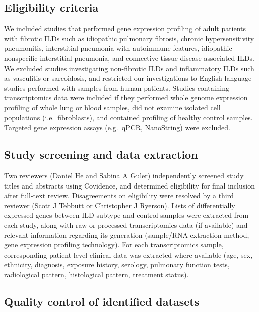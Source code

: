 \documentclass[
]{article}
\begin{document}
\hypertarget{eligibility-criteria}{%
\subsection{Eligibility criteria}\label{eligibility-criteria}}

We included studies that performed gene expression profiling of adult patients with fibrotic ILDs such as idiopathic pulmonary fibrosis, chronic hypersensitivity pneumonitis, interstitial pneumonia with autoimmune features, idiopathic nonspecific interstitial pneumonia, and connective tissue disease-associated ILDs. We excluded studies investigating non-fibrotic ILDs and inflammatory ILDs such as vasculitis or sarcoidosis, and restricted our investigations to English-language studies performed with samples from human patients. Studies containing transcriptomics data were included if they performed whole genome expression profiling of whole lung or blood samples, did not examine isolated cell populations (i.e.~fibroblasts), and contained profiling of healthy control samples. Targeted gene expression assays (e.g.~qPCR, NanoString) were excluded.

\hypertarget{study-screening-and-data-extraction}{%
\subsection{Study screening and data extraction}\label{study-screening-and-data-extraction}}

Two reviewers (Daniel He and Sabina A Guler) independently screened study titles and abstracts using Covidence, and determined eligibility for final inclusion after full-text review. Disagreements on eligibility were resolved by a third reviewer (Scott J Tebbutt or Christopher J Ryerson). Lists of differentially expressed genes between ILD subtype and control samples were extracted from each study, along with raw or processed transcriptomics data (if available) and relevant information regarding its generation (sample/RNA extraction method, gene expression profiling technology). For each transcriptomics sample, corresponding patient-level clinical data was extracted where available (age, sex, ethnicity, diagnosis, exposure history, serology, pulmonary function tests, radiological pattern, histological pattern, treatment status).

\hypertarget{qc}{%
\subsection{Quality control of identified datasets}\label{qc}}
\end{document}
